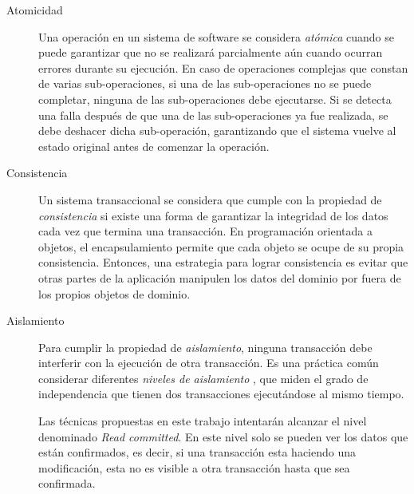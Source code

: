 \begin{description}
	\item[Atomicidad]
		Una operación en un sistema de software se considera \emph{atómica} cuando se
		puede garantizar que no se realizará parcialmente aún cuando ocurran errores
		durante su ejecución. 
		En caso de operaciones complejas que constan de varias sub-operaciones, si una
		de las sub-operaciones no se puede completar, ninguna de las sub-operaciones
		debe ejecutarse. Si se detecta una falla después de que una de las
		sub-operaciones ya fue realizada, se debe deshacer dicha
		sub-operación, garantizando que el sistema vuelve al estado original antes de
		comenzar la operación.
		
	\item[Consistencia]
		Un sistema transaccional se considera que cumple con la propiedad de
		\emph{consistencia} si existe una forma de garantizar la integridad de los
		datos cada vez que termina una transacción.
		En programación orientada a objetos, el encapsulamiento permite que cada
		objeto se ocupe de su propia consistencia. 
		Entonces, una estrategia para lograr consistencia es evitar que otras partes
		de la aplicación manipulen los datos del dominio por fuera de los
		propios objetos de dominio.
	  
	\item[Aislamiento] \label{isolation}
		Para cumplir la propiedad de \emph{aislamiento}, ninguna
		transacción debe interferir con la ejecución de otra transacción.
		Es una práctica común considerar diferentes \emph{niveles de aislamiento}
		\cite{ANSI:1992:ANSd}, que miden el grado de independencia que tienen dos
		transacciones ejecutándose al mismo tiempo.

		Las técnicas propuestas en este trabajo intentarán alcanzar el nivel
		denominado \emph{Read committed}.
		En este nivel solo se pueden ver los datos que están confirmados, es decir, si
		una transacción esta haciendo una modificación, esta no es visible a otra
		transacción hasta que sea confirmada.


% 		
% 				
	
	\end{description}
		
